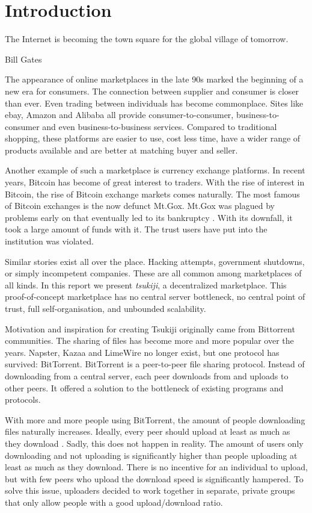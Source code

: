 \section{Introduction}
\epigraph{The Internet is becoming the town square for the global village of tomorrow.}{Bill Gates}

The appearance of online marketplaces in the late 90s marked the beginning of a new era for consumers.
The connection between supplier and consumer is closer than ever.
Even trading between individuals has become commonplace.
Sites like ebay, Amazon and Alibaba all provide consumer-to-consumer, business-to-consumer and even business-to-business services.
Compared to traditional shopping, these platforms are easier to use, cost less time, have a wider range of products available and are better at matching buyer and seller.

Another example of such a marketplace is currency exchange platforms.
In recent years, Bitcoin has become of great interest to traders.
With the rise of interest in Bitcoin, the rise of Bitcoin exchange markets comes naturally.
The most famous of Bitcoin exchanges is the now defunct Mt.Gox.
Mt.Gox was plagued by problems early on that eventually led to its bankruptcy \cite{gox}.
With its downfall, it took a large amount of funds with it.
The trust users have put into the institution was violated.


Similar stories exist all over the place. Hacking attempts, government shutdowns, or simply incompetent companies.
These are all common among marketplaces of all kinds.
In this report we present \textit{tsukiji}, a decentralized marketplace.
This proof-of-concept marketplace has no central server bottleneck, no central point of trust, full self-organisation, and unbounded scalability.

Motivation and inspiration for creating Tsukiji originally came from Bittorrent communities.
The sharing of files has become more and more popular over the years.
Napster, Kazaa and LimeWire no longer exist, but one protocol has survived: BitTorrent.
BitTorrent is a peer-to-peer file sharing protocol.
Instead of downloading from a central server, each peer downloads from and uploads to other peers.
It offered a solution to the bottleneck of existing programs and protocols.

With more and more people using BitTorrent, the amount of people downloading files naturally increases.
Ideally, every peer should upload at least as much as they download \cite{bittorrent}.
Sadly, this does not happen in reality.
The amount of users only downloading and not uploading is significantly higher than people uploading at least as much as they download.
There is no incentive for an individual to upload, but with few peers who upload the download speed is significantly hampered.
To solve this issue, uploaders decided to work together in separate, private groups that only allow people with a good upload/download ratio.


